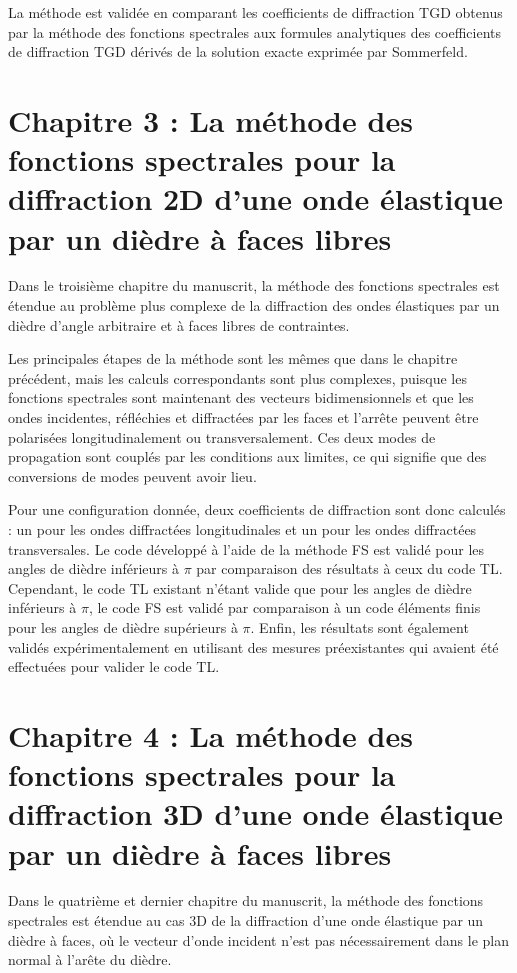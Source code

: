 La méthode est validée en comparant les coefficients de diffraction TGD obtenus par la méthode des fonctions spectrales aux formules analytiques des coefficients de diffraction TGD dérivés de la solution exacte exprimée par Sommerfeld.

\section[Résumé du chapitre 3]{Chapitre 3 : La méthode des fonctions spectrales pour la diffraction 2D d'une onde élastique par un dièdre à faces libres}

Dans le troisième chapitre du manuscrit, la méthode des fonctions spectrales est étendue au problème plus complexe de la diffraction des ondes élastiques par un dièdre d'angle arbitraire et à faces libres de contraintes.

Les principales étapes de la méthode sont les mêmes que dans le chapitre précédent, mais les calculs correspondants sont plus complexes, puisque les fonctions spectrales sont maintenant des vecteurs bidimensionnels et que les ondes incidentes, réfléchies et diffractées par les faces et l'arrête peuvent être polarisées longitudinalement ou transversalement. Ces deux modes de propagation sont couplés par les conditions aux limites, ce qui signifie que des conversions de modes peuvent avoir lieu. 

Pour une configuration donnée, deux coefficients de diffraction sont donc calculés : un pour les ondes diffractées longitudinales et un pour les ondes diffractées transversales. Le code développé à l'aide de la méthode FS est validé pour les angles de dièdre inférieurs à $\pi$ par comparaison des résultats à ceux du code TL. Cependant, le code TL existant n'étant valide que pour les angles de dièdre inférieurs à $\pi$, le code FS est validé par comparaison à un code éléments finis pour les angles de dièdre supérieurs à $\pi$. Enfin, les résultats sont également validés expérimentalement en utilisant des mesures préexistantes qui avaient été effectuées pour valider le code TL.

\section[Résumé du chapitre 4]{Chapitre 4 : La méthode des fonctions spectrales pour la diffraction 3D d'une onde élastique par un dièdre à faces libres}

Dans le quatrième et dernier chapitre du manuscrit, la méthode des fonctions spectrales est étendue au cas 3D de la diffraction d'une onde élastique par un dièdre à faces, où le vecteur d'onde incident n'est pas nécessairement dans le plan normal à l'arête du dièdre. 

